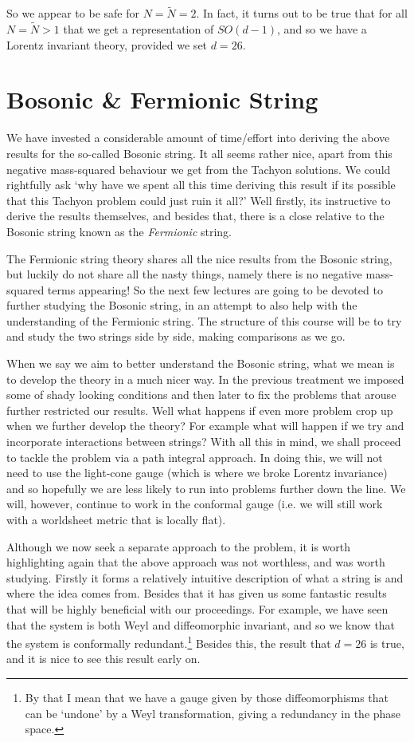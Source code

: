 So we appear to be safe for $N=\widetilde{N}=2$. In fact, it turns out to be true that for all $N=\widetilde{N}>1$ that we get a representation of $SO(d-1)$, and so we have a Lorentz invariant theory, provided we set $d=26$. 

\section{Bosonic \& Fermionic String}

We have invested a considerable amount of time/effort into deriving the above results for the so-called Bosonic string. It all seems rather nice, apart from this negative mass-squared behaviour we get from the Tachyon solutions. We could rightfully ask `why have we spent all this time deriving this result if its possible that this Tachyon problem could just ruin it all?' Well firstly, its instructive to derive the results themselves, and besides that, there is a close relative to the Bosonic string known as the \textit{Fermionic} string. 

The Fermionic string theory shares all the nice results from the Bosonic string, but luckily do not share all the nasty things, namely there is no negative mass-squared terms appearing! So the next few lectures are going to be devoted to further studying the Bosonic string, in an attempt to also help with the understanding of the Fermionic string. The structure of this course will be to try and study the two strings side by side, making comparisons as we go. 

When we say we aim to better understand the Bosonic string, what we mean is to develop the theory in a much nicer way. In the previous treatment we imposed some of shady looking conditions and then later to fix the problems that arouse further restricted our results. Well what happens if even more problem crop up when we further develop the theory? For example what will happen if we try and incorporate interactions between strings? With all this in mind, we shall proceed to tackle the problem via a path integral approach. In doing this, we will not need to use the light-cone gauge (which is where we broke Lorentz invariance) and so hopefully we are less likely to run into problems further down the line. We will, however, continue to work in the conformal gauge (i.e. we will still work with a worldsheet metric that is locally flat). 

Although we now seek a separate approach to the problem, it is worth highlighting again that the above approach was not worthless, and was worth studying. Firstly it forms a relatively intuitive description of what a string is and where the idea comes from. Besides that it has given us some fantastic results that will be highly beneficial with our proceedings. For example, we have seen that the system is both Weyl and diffeomorphic invariant, and so we know that the system is conformally redundant.\footnote{By that I mean that we have a gauge given by those diffeomorphisms that can be `undone' by a Weyl transformation, giving a redundancy in the phase space.} Besides this, the result that $d=26$ is true, and it is nice to see this result early on.  